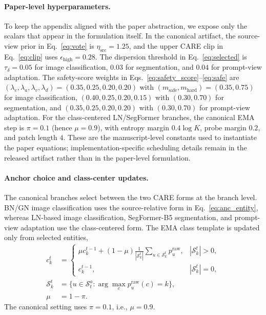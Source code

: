 \paragraph{Paper-level hyperparameters.}
To keep the appendix aligned with the paper abstraction, we expose only the scalars that appear in the formulation itself. In the canonical artifact, the source-view prior in Eq.~\ref{eq:vote} is $\eta_{\mathrm{src}}=1.25$, and the upper CARE clip in Eq.~\ref{eq:clip} uses $\epsilon_{\mathrm{high}}=0.28$. The \core{} dispersion threshold in Eq.~\ref{eq:selected} is $\tau_{\delta}=0.05$ for image classification, $0.03$ for segmentation, and $0.04$ for prompt-view adaptation. The safety-score weights in Eqs.~\ref{eq:safety_score}--\ref{eq:safe} are $(\lambda_e,\lambda_a,\lambda_v,\lambda_d)=(0.35,0.25,0.20,0.20)$ with $(m_{\mathrm{safe}},m_{\mathrm{hard}})=(0.35,0.75)$ for image classification, $(0.40,0.25,0.20,0.15)$ with $(0.30,0.70)$ for segmentation, and $(0.35,0.25,0.20,0.20)$ with $(0.30,0.70)$ for prompt-view adaptation. For the class-centered LN/SegFormer branches, the canonical EMA step is $\pi=0.1$ (hence $\mu=0.9$), with entropy margin $0.4\log K$, probe margin $0.2$, and patch length $4$. These are the manuscript-level constants used to instantiate the paper equations; implementation-specific scheduling details remain in the released artifact rather than in the paper-level formulation.

\paragraph{Anchor choice and class-center updates.}
The canonical branches select between the two CARE forms at the branch level. BN/GN image classification uses the source-relative form in Eq.~\ref{eq:anc_entity}, whereas LN-based image classification, SegFormer-B5 segmentation, and prompt-view adaptation use the class-centered form. The EMA class template is updated only from selected entities,
\begin{equation}
\begin{aligned}
c_k^t
&=
\begin{cases}
\mu c_k^{t-1}
+
(1-\mu)
\frac{1}{|\mathcal{S}_k^t|}
\sum_{u\in\mathcal{S}_k^t} p_u^{\mathrm{raw}},
& |\mathcal{S}_k^t|>0,\\
c_k^{t-1},
& |\mathcal{S}_k^t|=0,
\end{cases}\\
\mathcal{S}_k^t
&=\{u\in\mathcal{S}_t^a:\arg\max_c p_u^{\mathrm{raw}}(c)=k\},\\
\mu&=1-\pi.
\end{aligned}
\end{equation}
The canonical setting uses $\pi=0.1$, i.e., $\mu=0.9$.

